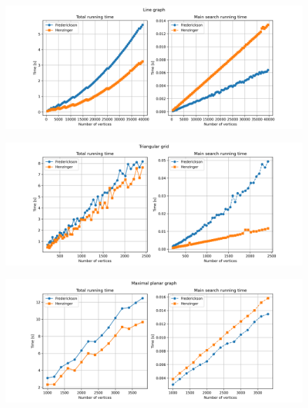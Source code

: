 \begin{figure}[H]
    \centering
    \begin{adjustbox}{center}
        \includegraphics[width=1.4\textwidth]{charts/line.png}
    \end{adjustbox}
    \caption{}
    \label{fig:line}
\end{figure}

\begin{figure}[H]
    \centering
    \begin{adjustbox}{center}
        \includegraphics[width=1.4\textwidth]{charts/trig.png}
    \end{adjustbox}
    \caption{}
    \label{fig:trig}
\end{figure}

\begin{figure}[H]
    \centering
    \begin{adjustbox}{center}
        \includegraphics[width=1.4\textwidth]{charts/max.png}
    \end{adjustbox}
    \caption{}
    \label{fig:max}
\end{figure}

